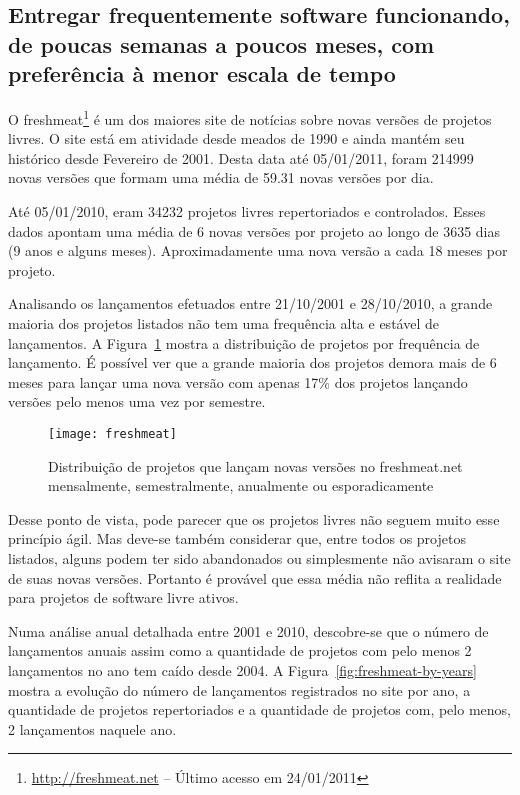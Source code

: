 \subsection[Entregas frequentes]{Entregar frequentemente software
  funcionando, de poucas semanas a poucos meses, com preferência à
  menor escala de tempo}

O freshmeat\footnote{\url{http://freshmeat.net} -- Último acesso em
  24/01/2011} é um dos maiores site de notícias sobre novas versões de
projetos livres. O site está em atividade desde meados de 1990 e ainda
mantém seu histórico desde Fevereiro de 2001. Desta data até
05/01/2011, foram 214999 novas versões que formam uma média de 59.31
novas versões por dia.

Até 05/01/2010, eram 34232 projetos livres repertoriados e
controlados. Esses dados apontam uma média de 6 novas versões por
projeto ao longo de 3635 dias (9 anos e alguns meses).
Aproximadamente uma nova versão a cada 18 meses por projeto.

Analisando os lançamentos efetuados entre 21/10/2001 e 28/10/2010, a
grande maioria dos projetos listados não tem uma frequência alta e
estável de lançamentos. A Figura~\ref{fig:freshmeat} mostra a
distribuição de projetos por frequência de lançamento. É possível ver
que a grande maioria dos projetos demora mais de 6 meses para lançar
uma nova versão com apenas 17\% dos projetos lançando versões pelo
menos uma vez por semestre.


\begin{figure}[htb]
  \centering
  \texttt{[image: freshmeat]}
  \caption{Distribuição de projetos que lançam novas versões no
    freshmeat.net mensalmente, semestralmente, anualmente ou
    esporadicamente}
  \label{fig:freshmeat}
\end{figure}

Desse ponto de vista, pode parecer que os projetos livres não seguem
muito esse princípio ágil. Mas deve-se também considerar que, entre
todos os projetos listados, alguns podem ter sido abandonados ou
simplesmente não avisaram o site de suas novas versões. Portanto é
provável que essa média não reflita a realidade para projetos de
software livre ativos.

Numa análise anual detalhada entre 2001 e 2010, descobre-se que o
número de lançamentos anuais assim como a quantidade de projetos com
pelo menos 2 lançamentos no ano tem caído desde 2004. A
Figura~\ref{fig:freshmeat-by-years} mostra a evolução do número de
lançamentos registrados no site por ano, a quantidade de projetos
repertoriados e a quantidade de projetos com, pelo menos, 2
lançamentos naquele ano.

